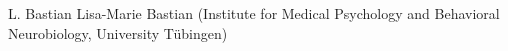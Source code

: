
                {L. Bastian}
                {Lisa-Marie Bastian (Institute for Medical Psychology and Behavioral Neurobiology, University Tübingen)}
                
